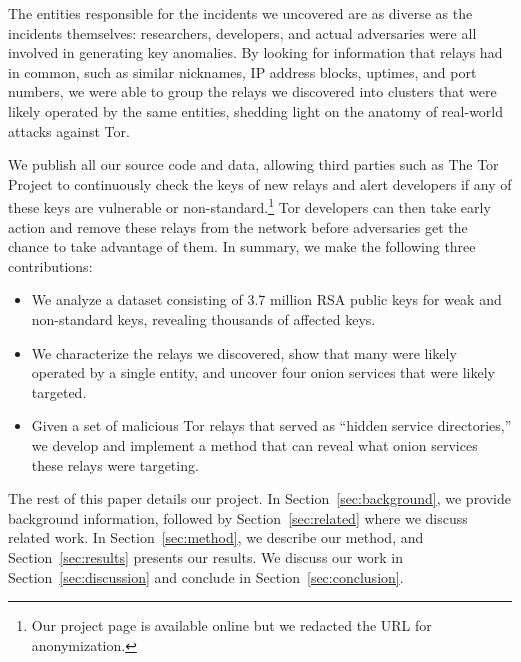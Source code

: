The entities responsible for the incidents we uncovered are as diverse as the
incidents themselves: researchers, developers, and actual adversaries were all
involved in generating key anomalies.  By looking for information that relays
had in common, such as similar nicknames, IP address blocks, uptimes, and port
numbers, we were able to group the relays we discovered into clusters that were
likely operated by the same entities, shedding light on the anatomy of
real-world attacks against Tor.

We publish all our source code and data, allowing third parties such as The Tor
Project to continuously check the keys of new relays and alert developers if
any of these keys are vulnerable or non-standard.\footnote{Our project page is
available online but we redacted the URL for anonymization.}  Tor
developers can then take early action and remove these relays from the network
before adversaries get the chance to take advantage of them.  In summary, we
make the following three contributions:
\begin{itemize}
	\item We analyze a dataset consisting of 3.7 million RSA public keys for
		weak and non-standard keys, revealing thousands of affected keys.

	\item We characterize the relays we discovered, show that many were
		likely operated by a single entity, and uncover four onion services that
		were likely targeted.

	\item Given a set of malicious Tor relays that served as ``hidden service
		directories,'' we develop and implement a method that can reveal what
		onion services these relays were targeting.
\end{itemize}

The rest of this paper details our project.  In Section~\ref{sec:background}, we
provide background information, followed by Section~\ref{sec:related} where we 
discuss related work.  In Section~\ref{sec:method}, we describe our method,
and Section~\ref{sec:results} presents our results.  We discuss our work in
Section~\ref{sec:discussion} and conclude in Section~\ref{sec:conclusion}.
